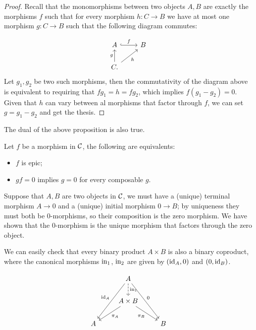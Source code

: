 \begin{proof}
	Recall that the monomorphisms between two objects $A,B$ are exactly the morphisms $f$ such that for every morphism $h:C \longrightarrow B$ we have at most one morphism $g:C \longrightarrow B$ such that the following diagram commutes:

	\[\begin{tikzcd}
		A & B \\
		C.
		\arrow["f", hook, from=1-1, to=1-2]
		\arrow["g", from=2-1, to=1-1]
		\arrow["h"', from=2-1, to=1-2]
	\end{tikzcd}\]
	Let $g_1,g_2$ be two such morphisms, then the commutativity of the diagram above is equivalent to requiring that $fg_1 = h = fg_2$, which implies $f(g_1 - g_2) = 0$. Given that $h$ can vary between al morphisms that factor through $f$, we can set $g = g_1 - g_2$ and get the thesis.

\end{proof}

The dual of the above proposition is also true.

\begin{proposition}
	Let $f$ be a morphism in $\mathcal{C}$, the following are equivalents:
	\begin{itemize}
		\item $f$ is epic;
		\item $gf = 0$ implies $g=0$ for every composable $g$.
	\end{itemize}
\end{proposition}


Suppose that $A,B$ are two objects in $\mathcal{C}$, we must have a (unique) terminal morphism $A \longrightarrow 0$ and a (unique) initial morphism $0 \longrightarrow B$; by uniqueness they must both be $0$-morphisms, so their composition is the zero morphism. We have shown that the $0$-morphism is the unique morphism that factors through the zero object.



We can easily check that every binary product $A \times B$ is also a binary coproduct, where the canonical morphisms $\mathrm{in}_1$, $\mathrm{in}_2$ are given by $(\mathrm{id}_A, 0)$ and $(0, \mathrm{id}_B)$.


\[\begin{tikzcd}
	& A \\
	& {A\times B} \\
	A && B
	\arrow["{\inn_1}", dashed, from=1-2, to=2-2]
	\arrow["{\id_A}"', from=1-2, to=3-1]
	\arrow["0", from=1-2, to=3-3]
	\arrow["{\pi_A}", from=2-2, to=3-1]
	\arrow["{\pi_B}"', from=2-2, to=3-3]
\end{tikzcd}\]

